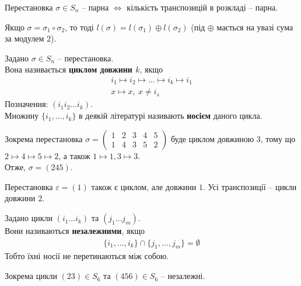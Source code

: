 \documentclass{math_library}
\begin{document}
\begin{corollary}
Перестановка $\sigma \in S_n$ -- парна $\iff$ кількість транспозицій в розкладі -- парна.
\end{corollary}

\begin{corollary}
Якщо $\sigma = \sigma_1 \circ \sigma_2$, то тоді $l(\sigma) = l(\sigma_1) \oplus l(\sigma_2)$ (під $\oplus$ мається на увазі сума за модулем $2$).
\end{corollary}

\begin{definition}
Задано $\sigma \in S_n$ -- перестановка.\\
Вона називається \textbf{циклом довжини $k$}, якщо
\begin{align*}
i_1 \mapsto i_2 \mapsto \dots \mapsto i_k \mapsto i_1 \\
x \mapsto x,\ x \neq i_s
\end{align*}
Позначення: $(i_1 i_2 \dots i_k)$.\\
Множину $\{i_1,\dots,i_k\}$ в деякій літературі називають \textbf{носієм} даного цикла.
\end{definition}


\begin{example}
Зокрема перестановка $\sigma = \begin{pmatrix}
1 & 2 & 3 & 4 & 5 \\
1 & 4 & 3 & 5 & 2 
\end{pmatrix}$ буде циклом довжиною $3$, тому що\\
$2 \mapsto 4 \mapsto 5 \mapsto 2$, а також $1 \mapsto 1, 3 \mapsto 3$.\\
Отже, $\sigma = (245)$.
\end{example}

\begin{remark}
Перестановка $\varepsilon = (1)$ також є циклом, але довжини $1$. Усі транспозиції -- цикли довжини $2$.
\end{remark}

\begin{definition}
Задано цикли $(i_1 \dots i_k)$ та $(j_1 \dots j_m)$.\\
Вони називаються \textbf{незалежними}, якщо
\begin{align*}
\{i_1,\dots,i_k\} \cap \{j_1,\dots,j_m\} = \emptyset
\end{align*}
Тобто їхні носії не перетинаються між собою.
\end{definition}

\begin{example}
Зокрема цикли $(23) \in S_6$ та $(456) \in S_6$ -- незалежні.
\end{example}
\end{document}
